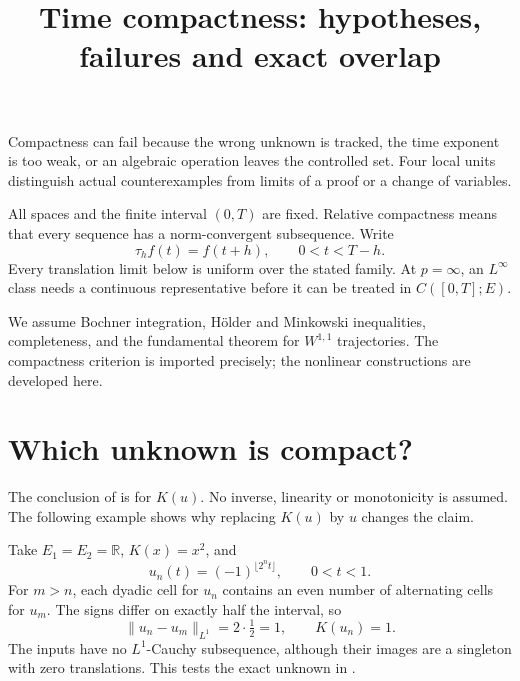 \documentclass[12pt,reqno]{amsart}
\title{Time compactness: hypotheses, failures and exact overlap}
\date{}
\begin{document}
\maketitle

Compactness can fail because the wrong unknown is tracked, the time exponent is too weak, or an algebraic operation leaves the controlled set. Four local units distinguish actual counterexamples from limits of a proof or a change of variables.

All spaces and the finite interval $(0,T)$ are fixed. Relative compactness means that every sequence has a norm-convergent subsequence. Write
\[
\tau_h f(t)=f(t+h),\qquad 0<t<T-h.
\]
Every translation limit below is uniform over the stated family. At $p=\infty$, an $L^\infty$ class needs a continuous representative before it can be treated in $C([0,T];E)$.

We assume Bochner integration, H\"older and Minkowski inequalities, completeness, and the fundamental theorem for $W^{1,1}$ trajectories. The compactness criterion is imported precisely; the nonlinear constructions are developed here.

\section{Which unknown is compact?}

\begin{theorem}[Maitre]\label{thm:maitre}

\end{theorem}

The conclusion of \cite[Theorem 2.1, p.~1726]{S-maitre} is for $K(u)$. No inverse, linearity or monotonicity is assumed. The following example shows why replacing $K(u)$ by $u$ changes the claim.

Take $E_1=E_2=\mathbb R$, $K(x)=x^2$, and
\[
u_n(t)=(-1)^{\lfloor2^nt\rfloor},\qquad 0<t<1.
\]
For $m>n$, each dyadic cell for $u_n$ contains an even number of alternating cells for $u_m$. The signs differ on exactly half the interval, so
\[
\|u_n-u_m\|_{L^1}=2\cdot\tfrac12=1,
\qquad K(u_n)=1.
\]
The inputs have no $L^1$-Cauchy subsequence, although their images are a singleton with zero translations. This tests the exact unknown in \cite[Theorem 2.1 and Remark 2.2(3), p.~1726]{S-maitre}.
\end{document}
